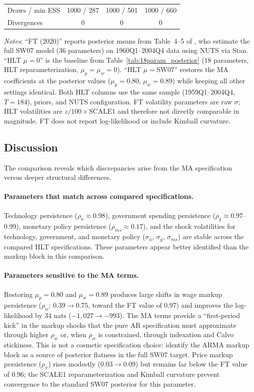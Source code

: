 \documentclass[12pt]{article}
\theoremstyle{plain}
\theoremstyle{definition}
\theoremstyle{remark}
\newcommand{\tablenotes}[1]{%
  \par\vspace{0.5em}%
  \noindent\begin{minipage}{\textwidth}%
  \raggedright\footnotesize #1%
  \end{minipage}\par%
}
\begin{document}
\begin{table}[htbp]
\begin{tabular}{llccc}
\multicolumn{2}{l}{Draws / min ESS} & 1000 / 287 & 1000 / 501 & 1000 / 660 \\
\multicolumn{2}{l}{Divergences} & 0 & 0 & 0 \\
\bottomrule
\end{tabular}
\smallskip
\tablenotes{\textit{Notes}: ``FT (2020)'' reports posterior means from Table~4--5 of \citet{farkas2020bayesian}, who estimate the full SW07 model (36 parameters) on 1960Q1--2004Q4 data using NUTS via Stan. ``HLT $\mu=0$'' is the baseline from Table~\ref{tab:18param_posterior} (18 parameters, HLT reparameterization, $\mu_p = \mu_w = 0$). ``HLT $\mu=\text{SW07}$'' restores the MA coefficients at the \citet{farkas2020bayesian} posterior values ($\mu_p = 0.80$, $\mu_w = 0.89$) while keeping all other settings identical. Both HLT columns use the same sample (1959Q1--2004Q4, $T=184$), priors, and NUTS configuration. FT volatility parameters are raw $\sigma$; HLT volatilities are $z/100 \times \text{SCALE1}$ and therefore not directly comparable in magnitude. FT does not report log-likelihood or include Kimball curvature.}
\end{table}

\subsection{Discussion}

The comparison reveals which discrepancies arise from the MA specification versus deeper structural differences.

\paragraph{Parameters that match across compared specifications.} Technology persistence ($\rho_a \approx 0.98$), government spending persistence ($\rho_g \approx 0.97$--0.99), monetary policy persistence ($\rho_{ms} \approx 0.17$), and the shock volatilities for technology, government, and monetary policy ($\sigma_a$, $\sigma_g$, $\sigma_{ms}$) are stable across the compared HLT specifications. These parameters appear better identified than the markup block in this comparison.

\paragraph{Parameters sensitive to the MA terms.} Restoring $\mu_p = 0.80$ and $\mu_w = 0.89$ produces large shifts in wage markup persistence ($\rho_w$: $0.39 \to 0.75$, toward the FT value of 0.97) and improves the log-likelihood by 34 nats ($-1{,}027 \to -993$). The MA terms provide a ``first-period kick'' in the markup shocks that the pure AR specification must approximate through higher $\rho_w$ or, when $\rho_w$ is constrained, through indexation and Calvo stickiness. This is not a cosmetic specification choice: \citet{farkas2020bayesian} identify the ARMA markup block as a source of posterior flatness in the full SW07 target. Price markup persistence ($\rho_\pi$) rises modestly ($0.03 \to 0.09$) but remains far below the FT value of 0.96; the SCALE1 reparameterization and Kimball curvature prevent convergence to the standard SW07 posterior for this parameter.
\end{document}

